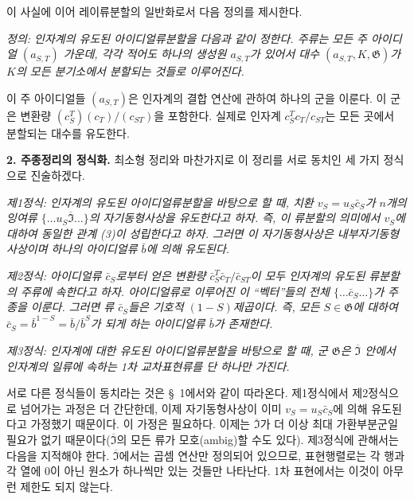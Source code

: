 이 사실에 이어 레이류분할의 일반화로서 다음 정의를 제시한다.

\emph{정의: 인자계의 유도된 아이디얼류분할을 다음과 같이 정한다. 주류는 모든 주 아이디얼 \((a_{S,T})\) 가운데, 각각 적어도 하나의 생성원 \(a_{S,T}\)가 있어서 대수 \((a_{S,T},K,\mathfrak G)\)가 \(K\)의 모든 분기소에서 분할되는 것들로 이루어진다.}

이 주 아이디얼들 \((a_{S,T})\)은 인자계의 결합 연산에 관하여 하나의 군을 이룬다. 이 군은 변환량 \((c_S^T)(c_T)/(c_{ST})\)을 포함한다. 실제로 인자계 \(c_S^Tc_T/c_{ST}\)는 모든 곳에서 분할되는 대수를 유도한다.

\noindent\textbf{2. 주종정리의 정식화.} 최소형 정리와 마찬가지로 이 정리를 서로 동치인 세 가지 정식으로 진술하겠다.

\emph{제1정식: 인자계의 유도된 아이디얼류분할을 바탕으로 할 때, 치환 \(v_S=u_S\bar c_S\)가 \(n\)개의 잉여류 \(\{\ldots u_S\overline{\mathfrak I}\ldots\}\)의 자기동형사상을 유도한다고 하자. 즉, 이 류분할의 의미에서 \(v_S\)에 대하여 동일한 관계 (3)이 성립한다고 하자. 그러면 이 자기동형사상은 내부자기동형사상이며 하나의 아이디얼류 \(\bar b\)에 의해 유도된다.}

\emph{제2정식: 아이디얼류 \(\bar c_S\)로부터 얻은 변환량 \(\bar c_S^T\bar c_T/\bar c_{ST}\)이 모두 인자계의 유도된 류분할의 주류에 속한다고 하자. 아이디얼류로 이루어진 이 ``벡터''들의 전체 \(\{\ldots\bar c_S\ldots\}\)가 주종을 이룬다. 그러면 류 \(\bar c_S\)들은 기호적 \((1-S)\)제곱이다. 즉, 모든 \(S\in\mathfrak G\)에 대하여 \(\bar c_S=\bar b^{1-S}=\bar b/\bar b^S\)가 되게 하는 아이디얼류 \(\bar b\)가 존재한다.}

\emph{제3정식: 인자계에 대한 유도된 아이디얼류분할을 바탕으로 할 때, 군 \(\mathfrak G\)은 \(\overline{\mathfrak I}\) 안에서 인자계의 일류에 속하는 1차 교차표현류를 단 하나만 가진다.}

서로 다른 정식들이 동치라는 것은 §~1에서와 같이 따라온다. 제1정식에서 제2정식으로 넘어가는 과정은 더 간단한데, 이제 자기동형사상이 이미 \(v_S=u_S\bar c_S\)에 의해 유도된다고 가정했기 때문이다. 이 가정은 필요하다. 이제는 \(\overline{\mathfrak I}\)가 더 이상 최대 가환부분군일 필요가 없기 때문이다(\(\overline{\mathfrak I}\)의 모든 류가 모호(ambig)할 수도 있다). 제3정식에 관해서는 다음을 지적해야 한다. \(\overline{\mathfrak I}\)에서는 곱셈 연산만 정의되어 있으므로, 표현행렬로는 각 행과 각 열에 0이 아닌 원소가 하나씩만 있는 것들만 나타난다. 1차 표현에서는 이것이 아무런 제한도 되지 않는다.

